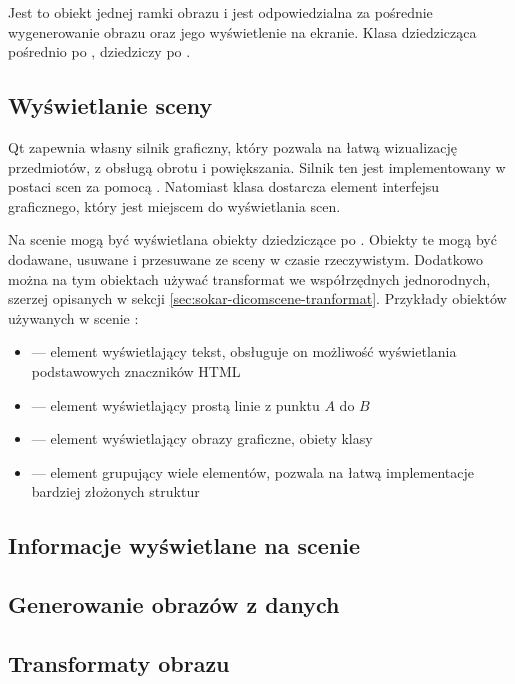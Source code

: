 \label{sec:sokar-dicomscene}

Jest to obiekt jednej ramki obrazu i jest odpowiedzialna za pośrednie wygenerowanie obrazu oraz jego wyświetlenie na ekranie.
Klasa dziedzicząca pośrednio po ,  dziedziczy po .

\subsection{Wyświetlanie sceny}
\par
Qt zapewnia własny silnik graficzny, który pozwala na łatwą wizualizację przedmiotów, z obsługą obrotu i powiększania.
Silnik ten jest implementowany w postaci scen za pomocą .
Natomiast klasa  dostarcza element interfejsu graficznego, który jest miejscem do wyświetlania scen.
\par
Na scenie mogą być wyświetlana obiekty dziedziczące po .
Obiekty te mogą być dodawane, usuwane i przesuwane ze sceny w czasie rzeczywistym.
Dodatkowo można  na tym obiektach używać transformat we współrzędnych jednorodnych, szerzej opisanych w sekcji \ref{sec:sokar-dicomscene-tranformat}.
Przykłady obiektów używanych w scenie :
\begin{itemize}
    \item {} --- element wyświetlający tekst, obsługuje on możliwość wyświetlania podstawowych znaczników HTML
    \item {} --- element wyświetlający prostą linie z punktu $A$ do $B$
    \item {} --- element wyświetlający obrazy graficzne, obiety klasy 
    \item {} --- element grupujący wiele elementów, pozwala na łatwą implementacje bardziej złożonych struktur
\end{itemize}

\subsection{Informacje wyświetlane na scenie}


\subsection{Generowanie obrazów z danych}


\subsection{Transformaty obrazu}
